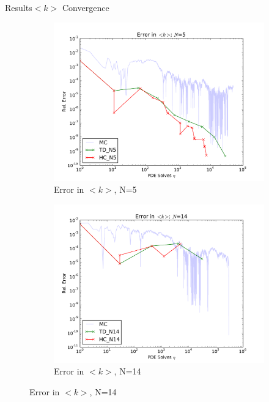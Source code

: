 \documentclass{beamer}
\begin{document}
\begin{frame}{Results}{$<k>$ Convergence}
  \begin{figure}[h!]
    \centering
    \begin{subfigure}[b]{0.49 \textwidth}
      \includegraphics[width=\textwidth]{../graphics/err_5}
      \caption{Error in $<k>$, N=5}
      \label{err_5}
    \end{subfigure}
    \begin{subfigure}[b]{0.49 \textwidth}
      \includegraphics[width=\textwidth]{../graphics/err_14}
      \caption{Error in $<k>$, N=14}
      \label{err_14}
    \end{subfigure}
  \end{figure}
\end{frame}
\end{document}
